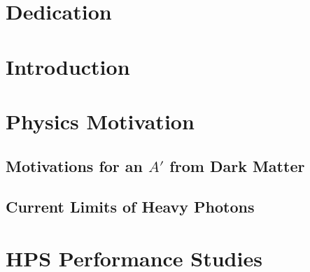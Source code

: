 \documentclass[12pt]{report}
\begin{document}



\chapter*{Dedication}

\tableofcontents

\chapter{Introduction}

\chapter{Physics Motivation}

\section{Motivations for an $A'$ from Dark Matter}
\section{Current Limits of Heavy Photons}





\chapter{HPS Performance Studies}
\end{document}

